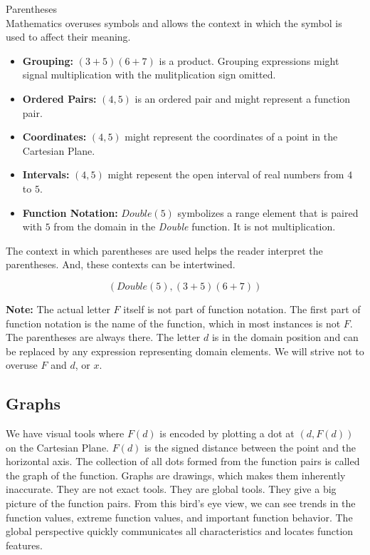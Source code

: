 \documentclass{ximera}
\begin{document}
\begin{notation}  Parentheses \\

Mathematics overuses symbols and allows the context in which the symbol is used to affect their meaning.
	\begin{itemize}
		\item \textbf{Grouping:} $(3+5)(6+7)$ is a product.  Grouping expressions might signal multiplication with the mulitplication sign omitted.
		\item \textbf{Ordered Pairs:} $(4, 5)$ is an ordered pair and might represent a function pair.
		\item \textbf{Coordinates:} $(4, 5)$ might represent the coordinates of a point in the Cartesian Plane.
		\item \textbf{Intervals:} $(4, 5)$ might repesent the open interval of real numbers from $4$ to $5$.
		\item \textbf{Function Notation:} $Double(5)$ symbolizes a range element that is paired with $5$ from the domain in the \textit{Double} function. It is not multiplication.
	\end{itemize}


The context in which parentheses are used helps the reader interpret the parentheses.  And, these contexts can be intertwined.

\[  (Double(5), (3+5)(6+7))    \]
\end{notation}


\textbf{Note:}  The actual letter $F$ itself is not part of function notation.  The first part of function notation is the name of the function, which in most instances is not $F$. The parentheses are always there.  The letter $d$ is in the domain position and can be replaced by any expression representing domain elements.  We will strive not to overuse $F$ and $d$, or $x$.










\subsection{Graphs}

We have visual tools where $F(d)$ is encoded by plotting a dot at $(d, F(d))$ on the Cartesian Plane.  $F(d)$ is the signed distance between the point and the horizontal axis. The collection of all dots formed from the function pairs is called the graph of the function. Graphs are drawings, which makes them inherently inaccurate.  They are not exact tools.  They are global tools.  They give a big picture of the function pairs.  From this bird's eye view, we can see trends in the function values, extreme function values, and important function behavior. The global perspective quickly communicates all characteristics and locates function features.
\end{document}
